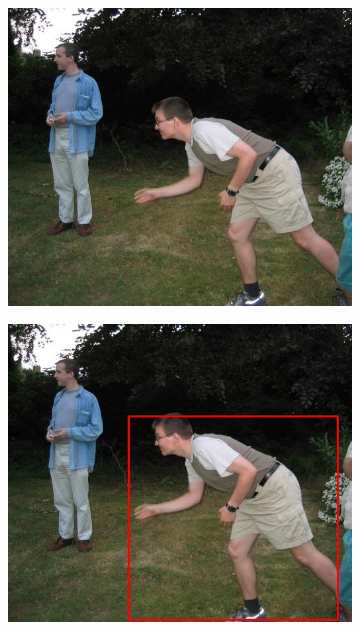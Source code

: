 \documentclass[a4paper,11]{article}
\begin{document}
  \begin{center}
  \begin{figure}[H]
    \begin{subfigure}{.33\textwidth}
      \centering
      \includegraphics[width=0.9\linewidth]{images/bool}
    \end{subfigure}
    \begin{subfigure}{.33\textwidth}
      \centering
      \includegraphics[width=0.9\linewidth]{results/input/bool}
    \end{subfigure}
    \begin{subfigure}{0.33\textwidth}
      \centering

\end{subfigure}
\end{figure}
\end{center}
\end{document}
